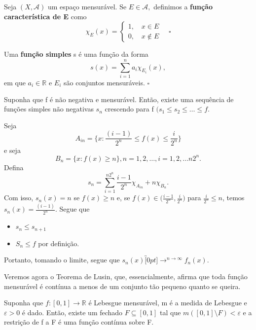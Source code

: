 \documentclass[measure_theory.tex]{subfiles}
\begin{document}
\begin{def*}
	Seja \((X, \mathcal{A})\) um espaço mensurável. Se \(E\in \mathcal{A},\) definimos a \textbf{função característica de E} como
	\[
		\chi_{E}(x)  = \left\{\begin{array}{ll}
			1,\quad x\in E \\
			0,\quad x\not\in E
		\end{array}\right.\quad \square
	\]
\end{def*}
\begin{def*}
	Uma \textbf{função simples} s é uma função da forma
	\[
		s(x) = \sum\limits_{i=1}^{n}a_{i}\chi_{E_{i}}(x),
	\]
	em que \(a_{i}\in \mathbb{R}\) e \(E_{i}\) são conjuntos mensuráveis. \(\square\)
\end{def*}
\begin{prop*}
	Suponha que f é não negativa e mensurável. Então, existe uma sequência de funções simples não negativas \(s_{n}\) crescendo para f \((s_1\leq s_2\leq \dotsc \leq f\).
\end{prop*}
\begin{proof*}
	Seja
	\[
		A_{in} = \biggl\{x: \frac{(i-1)}{2^{n}} \leq f(x) \leq \frac{i}{2^{n}}\biggr\}
	\]
	e seja
	\[
		B_{n} = \{x: f(x) \geq n\}, n =1, 2,\dotsc , i = 1, 2, \dotsc n2^{n}.
	\]
	Defina
	\[
		s_{n} = \sum\limits_{i=1}^{n2^{n}}\frac{i-1}{2^{n}}\chi_{A_{in}} + n\chi_{B_{n}}.
	\]
	Com isso, \(s_{n}(x) = n \) se \(f(x)\geq n\) e, se \(f(x)\in \biggl(\frac{i-1}{2^{n}}, \frac{i}{2^{n}}\biggr)\) para \(\frac{i}{2^{n}} \leq n\), temos \(s_{n}(x) = \frac{(i-1)}{2^{n}}.\) Segue que
	\begin{itemize}
		\item \(s_{n} \leq s_{n+1}\)
		\item \(S_{n} \leq f\) por definição.
	\end{itemize}
	Portanto, tomando o limite, segue que \(s_{n}(x)\overbracket[0pt]{\longrightarrow}^{n\to \infty}f_{n}(x)\).
\end{proof*}
Veremos agora o Teorema de Lusin, que, essencialmente, afirma que toda função mensurável é
contínua a menos de um conjunto tão pequeno quanto se queira.
\begin{theorem*}[Lusin]
	Suponha que \(f:[0, 1]\rightarrow \mathbb{R}\) é Lebesgue mensurável, m é a medida de Lebesgue e \(\varepsilon > 0\) é dado. Então, existe um fechado \(F\subseteq [0, 1]\) tal que
	\(m([0, 1]\setminus{F}) < \varepsilon \) e a restrição de f a F é uma função contínua sobre F.
\end{theorem*}
\end{document}
